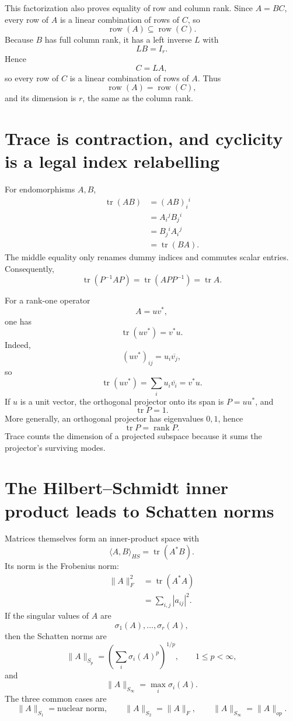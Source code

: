 This factorization also proves equality of row and column rank.  Since \(A=BC\), every row of \(A\) is a linear combination of rows of \(C\), so
\[
  \operatorname{row}(A)
  \subseteq\operatorname{row}(C).
\]
Because \(B\) has full column rank, it has a left inverse \(L\) with
\[
  LB=I_r.
\]
Hence
\[
  C=LA,
\]
so every row of \(C\) is a linear combination of rows of \(A\).  Thus
\[
  \operatorname{row}(A)
  =\operatorname{row}(C),
\]
and its dimension is \(r\), the same as the column rank.

\section{Trace is contraction, and cyclicity is a legal index relabelling}

For endomorphisms \(A,B\),
\[
\begin{aligned}
  \operatorname{tr}(AB)
  &=(AB)_i{}^i\\
  &=A_i{}^jB_j{}^i\\
  &=B_j{}^iA_i{}^j\\
  &=\operatorname{tr}(BA).
\end{aligned}
\]
The middle equality only renames dummy indices and commutes scalar entries.  Consequently,
\[
  \operatorname{tr}(P^{-1}AP)
  =\operatorname{tr}(APP^{-1})
  =\operatorname{tr}A.
\]

For a rank-one operator
\[
  A=uv^*,
\]
one has
\[
  \boxed{
  \operatorname{tr}(uv^*)=v^*u.}
\]
Indeed,
\[
  (uv^*)_{ij}=u_i\overline{v_j},
\]
so
\[
  \operatorname{tr}(uv^*)
  =\sum_i u_i\overline{v_i}
  =v^*u.
\]
If \(u\) is a unit vector, the orthogonal projector onto its span is \(P=uu^*\), and
\[
  \operatorname{tr}P=1.
\]
More generally, an orthogonal projector has eigenvalues \(0,1\), hence
\[
  \operatorname{tr}P=\operatorname{rank}P.
\]
Trace counts the dimension of a projected subspace because it sums the projector's surviving modes.

\section{The Hilbert--Schmidt inner product leads to Schatten norms}

Matrices themselves form an inner-product space with
\[
  \langle A,B\rangle_{HS}
  =\operatorname{tr}(A^*B).
\]
Its norm is the Frobenius norm:
\[
\begin{aligned}
  \|A\|_F^2
  &=\operatorname{tr}(A^*A)\\
  &=\sum_{i,j}|a_{ij}|^2.
\end{aligned}
\]
If the singular values of \(A\) are
\[
  \sigma_1(A),\ldots,\sigma_r(A),
\]
then the Schatten norms are
\[
  \|A\|_{S_p}
  =
  \left(
  \sum_i\sigma_i(A)^p
  \right)^{1/p},
  \qquad1\le p<\infty,
\]
and
\[
  \|A\|_{S_\infty}=\max_i\sigma_i(A).
\]
The three common cases are
\[
  \|A\|_{S_1}=\text{nuclear norm},
  \qquad
  \|A\|_{S_2}=\|A\|_F,
  \qquad
  \|A\|_{S_\infty}=\|A\|_{op}.
\]

